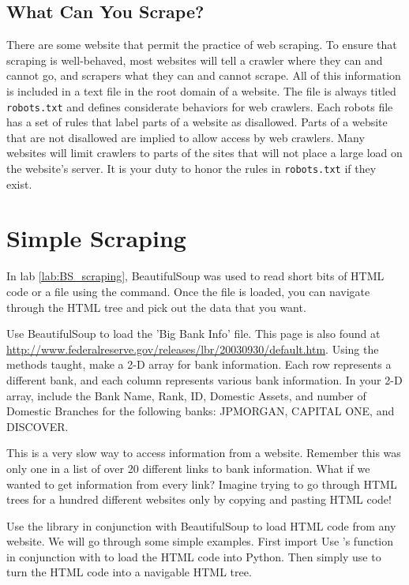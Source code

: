 \subsection*{What Can You Scrape?}
There are some website that permit the practice of web scraping.
To ensure that scraping is well-behaved, most websites will tell a crawler where they can and cannot go, and scrapers what they can and cannot scrape.
All of this information is included in a text file in the root domain of a website.
The file is always titled \texttt{robots.txt} and defines considerate behaviors for web crawlers.
Each robots file has a set of rules that label parts of a website as disallowed.
Parts of a website that are not disallowed are implied to allow access by web crawlers.
Many websites will limit crawlers to parts of the sites that will not place a large load on the 
website's server.
It is your duty to honor the rules in \texttt{robots.txt} if they exist.

\section*{Simple Scraping}
In lab \ref{lab:BS_scraping}, BeautifulSoup was used to read short bits of HTML code or a file using the  command.
Once the file is loaded, you can navigate through the HTML tree and pick out the data that you want.

\begin{problem}
Use BeautifulSoup to load the 'Big Bank Info' file.
This page is also found at \url{http://www.federalreserve.gov/releases/lbr/20030930/default.htm}.
Using the methods taught, make a 2-D array for bank information.
Each row represents a different bank, and each column represents various bank information.
In your 2-D array, include the Bank Name, Rank, ID, Domestic Assets, and number of Domestic Branches for the following banks: JPMORGAN, CAPITAL ONE, and DISCOVER.
\end{problem}

This is a very slow way to access information from a website.
Remember this was only one in a list of over 20 different links to bank information.
What if we wanted to get information from every link?
Imagine trying to go through HTML trees for a hundred different websites only by copying and pasting HTML code!

Use the  library in conjunction with BeautifulSoup to load HTML code from any website.
We will go through some simple examples.
First import 
Use 's  function in conjunction with  to load the HTML code into Python.
Then simply use  to turn the HTML code into a navigable HTML tree.

